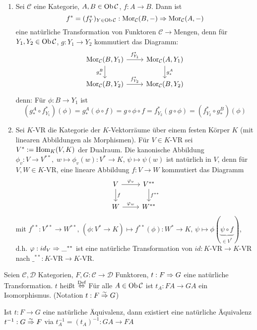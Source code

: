 \begin{bsp}
	\begin{enumerate}[label= \alph*)]
		\item Sei $\mathcal{C}$ eine Kategorie, $A,B\in \text{Ob}\,\mathcal{C}$, $f:A\to B$. Dann ist 
		$$f^* = (f^*_Y)_{Y\in \text{Ob}\,\mathcal{C}} : \text{Mor}_{\mathcal{C}}(B, -) \Rightarrow \text{Mor}_{\mathcal{C}}(A, -)$$
		eine natürliche Transformation von Funktoren $\mathcal{C} \to \text{Mengen}$, denn für $Y_1, Y_2\in \text{Ob}\,\mathcal{C}$, $g:Y_1 \to Y_2$ kommutiert das Diagramm:
		$$\begin{tikzcd}
		\Mor_{\mathcal{C}}(B, Y_1) \arrow{r}{f_{Y_1}^*}\arrow[swap]{d}{g_*^B} & \Mor_{\mathcal{C}}(A, Y_1)\arrow{d}{g_*^A} \\
		\Mor_{\mathcal{C}}(B, Y_2) \arrow{r}{f_{Y_2}^*} & \Mor_{\mathcal{C}}(B, Y_2)
		\end{tikzcd}$$
		denn: Für $\phi:B\to Y_1$ ist 
		$$(g_*^A \circ f_{Y_1}^*)(\phi) = g_*^A(\phi \circ f) = g \circ \phi \circ f = f^*_{Y_2}(g\circ \phi) = (f_{Y_2}^* \circ g_*^B) (\phi)$$
		\item Sei $K$-VR die Kategorie der $K$-Vektorräume über einem festen Körper $K$ (mit linearen Abbildungen als Morphismen). Für $V\in K$-VR sei $V^*:= \operatorname{Hom}_K(V,K)$ der Dualraum. Die kanonische Abbildung $\phi_v:V \to V^{**}, \; w \mapsto \phi_v(w):V^* \to K, \, \psi \mapsto \psi(w)$ ist natürlich in $V$, denn für $V,W \in K$-VR, eine lineare Abbildung $f:V \to W$ kommutiert das Diagramm
		$$\begin{tikzcd}
		V \arrow{r}{\phi_v}\arrow{d}{f} & V^{**}  \arrow{d}{f^{**}} \\W \arrow{r}{\phi_w} & W^{**}
		\end{tikzcd}$$
		mit $f^{**}: V^{**} \to W^{**}, \, (\phi: V^* \to K) \mapsto f^{**}(\phi) : W^* \to K, \, \psi \mapsto \phi(\underbrace{\psi \circ f}_{\in V^*})$, d.h. $\varphi:id_V \Rightarrow \_^{**}$ ist eine natürliche Transformation von $id:K$-VR$ \to K$-VR nach $\_^{**}:K$-VR$ \to K$-VR.
	\end{enumerate}
\end{bsp}
\begin{df}\label{df4.16}
	Seien $\mathcal{C}, \mathcal{D}$ Kategorien, $F,G: \mathcal{C} \to \mathcal{D}$ Funktoren, $t:F\Rightarrow G$ eine natürliche Transformation. $t$ heißt  $\overset{\text{Def}}{\Leftrightarrow}$ Für alle $A\in \text{Ob}\,\mathcal{C}$ ist $t_A:FA \to GA$ ein Isomorphismus. (Notation $t: F\overset{\sim}{\Rightarrow} G$)
\end{df}
\begin{anm}
	Ist $t:F\to G$ eine natürliche Äquivalenz, dann existiert eine natürliche Äquivalenz $t^{-1}: G \overset{\sim}{\Rightarrow} F$ via $t_A^{-1} = (t_A)^{-1} : GA \to FA$ 
\end{anm}
